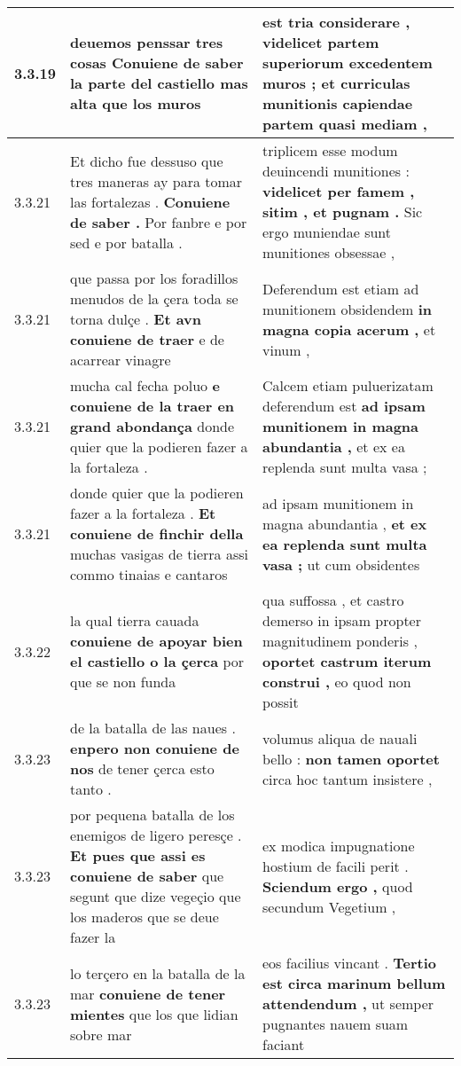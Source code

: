 \begin{tabular}{|p{1cm}|p{6.5cm}|p{6.5cm}|}
3.3.19 & deuemos penssar tres cosas \textbf{ Conuiene de saber la parte del castiello } mas alta que los muros & est tria considerare , \textbf{ videlicet partem superiorum excedentem muros ; } et curriculas munitionis capiendae partem quasi mediam , \\\hline
3.3.21 & Et dicho fue dessuso que tres maneras ay para tomar las fortalezas . \textbf{ Conuiene de saber . } Por fanbre e por sed e por batalla . & triplicem esse modum deuincendi munitiones : \textbf{ videlicet per famem , sitim , et pugnam . } Sic ergo muniendae sunt munitiones obsessae , \\\hline
3.3.21 & que passa por los foradillos menudos de la çera toda se torna dulçe . \textbf{ Et avn conuiene de traer } e de acarrear vinagre & Deferendum est etiam ad munitionem obsidendem \textbf{ in magna copia acerum , } et vinum , \\\hline
3.3.21 & mucha cal fecha poluo \textbf{ e conuiene de la traer en grand abondança } donde quier que la podieren fazer a la fortaleza . & Calcem etiam puluerizatam deferendum est \textbf{ ad ipsam munitionem in magna abundantia , } et ex ea replenda sunt multa vasa ; \\\hline
3.3.21 & donde quier que la podieren fazer a la fortaleza . \textbf{ Et conuiene de finchir della } muchas vasigas de tierra assi commo tinaias e cantaros & ad ipsam munitionem in magna abundantia , \textbf{ et ex ea replenda sunt multa vasa ; } ut cum obsidentes \\\hline
3.3.22 & la qual tierra cauada \textbf{ conuiene de apoyar bien el castiello o la çerca } por que se non funda & qua suffossa , et castro demerso in ipsam propter magnitudinem ponderis , \textbf{ oportet castrum iterum construi , } eo quod non possit \\\hline
3.3.23 & de la batalla de las naues . \textbf{ enpero non conuiene de nos } de tener çerca esto tanto . & volumus aliqua de nauali bello : \textbf{ non tamen oportet } circa hoc tantum insistere , \\\hline
3.3.23 & por pequena batalla de los enemigos de ligero peresçe . \textbf{ Et pues que assi es conuiene de saber } que segunt que dize vegeçio que los maderos que se deue fazer la & ex modica impugnatione hostium de facili perit . \textbf{ Sciendum ergo , } quod secundum Vegetium , \\\hline
3.3.23 & lo terçero en la batalla de la mar \textbf{ conuiene de tener mientes } que los que lidian sobre mar & eos facilius vincant . \textbf{ Tertio est circa marinum bellum attendendum , } ut semper pugnantes nauem suam faciant \\\hline

\end{tabular}
